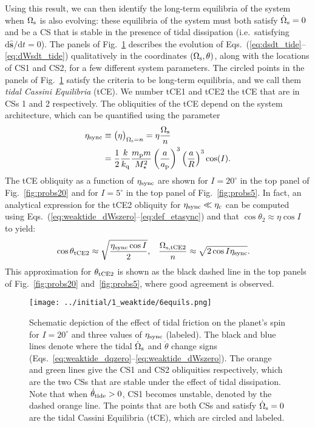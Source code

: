 \documentclass[
        fleqn,
        usenatbib,
    ]{mnras}
\newcommand*{\rdil}[2]{\mathrm{d}#1/\mathrm{d}#2}
\newcommand*{\p}[1]{\left(#1\right)}
\newcommand*{\uv}[1]{\hat{\mathbf{#1}}}
\begin{document}
Using this result, we can then identify the long-term equilibria of the system
when $\Omega_{\rm s}$ is also evolving: these equilibria of the system must both
satisfy $\dot{\Omega}_{\rm s} = 0$ and be a CS that is stable in the presence of
tidal dissipation (i.e.\ satisfying $\rdil{\uv{s}}{t} = 0$).
The panels of Fig.~\ref{fig:6equils} describes the evolution of
Eqs.~(\ref{eq:dsdt_tide}--\ref{eq:dWsdt_tide}) qualitatively in the coordinates
$(\Omega_{\rm s}, \theta)$, along with the locations of CS1 and CS2, for a few
different system parameters. The circled points in the panels of
Fig.~\ref{fig:6equils} satisfy the criteria to be long-term equilibria, and we
call them \emph{tidal Cassini Equilibria} (tCE). We number tCE1 and tCE2 the tCE
that are in CSs 1 and 2 respectively. The obliquities of the tCE depend on the
system architecture, which can be quantified using the parameter
\begin{align}
    \eta_{\rm sync} &\equiv \big(\eta\big)_{\Omega_{\rm s} = n}
        = \eta \frac{\Omega_{\rm s}}{n}\nonumber\\
        &= \frac{1}{2}\frac{k}{k_{\rm q}}
            \frac{m_{\rm p}m}{M_\star^2}
            \p{\frac{a}{a_{\rm p}}}^3 \p{\frac{a}{R}}^3\cos(I).
            \label{eq:def_etasync}
\end{align}
The tCE obliquity as a function of $\eta_{\rm sync}$ are shown for $I =
20^\circ$ in the top panel of Fig.~\ref{fig:probs20} and for $I = 5^\circ$ in
the top panel of Fig.~\ref{fig:probs5}. In fact, an analytical expression for
the tCE2 obliquity for $\eta_{\rm sync} \ll \eta_{\rm c}$ can be computed using
Eqs.~(\ref{eq:weaktide_dWszero}--\ref{eq:def_etasync}) and that $\cos \theta_2
\approx \eta \cos I$ to yield:
\begin{align}
    \cos \theta_{\rm tCE2} &\approx \sqrt{\frac{\eta_{\rm sync} \cos I}{2}},
        &
    \frac{\Omega_{\rm s, tCE2}}{n} &\approx
        \sqrt{2\cos I \eta_{\rm sync}}. \label{eq:def_tce2_approx}
\end{align}
This approximation for $\theta_{\rm tCE2}$ is shown as the black dashed line in
the top panels of Fig.~\ref{fig:probs20} and~\ref{fig:probs5}, where good
agreement is observed.
\begin{figure}
    \centering
    \texttt{[image: ../initial/1\_weaktide/6equils.png]}
    \caption{Schematic depiction of the effect of tidal friction on the planet's
    spin for $I = 20^\circ$ and three values of $\eta_{\rm sync}$ (labeled). The
    black and blue lines denote where the tidal $\dot{\Omega}_{\rm s}$ and
    $\dot{\theta}$ change signs
    (Eqs.~\ref{eq:weaktide_dqzero}--\ref{eq:weaktide_dWszero}). The orange and
    green lines give the CS1 and CS2 obliquities respectively, which are the two
    CSs that are stable under the effect of tidal dissipation. Note that when
    $\dot{\theta}_{\rm tide} > 0$, CS1 becomes unstable, denoted by the dashed
    orange line. The points that are both CSs and satisfy $\dot{\Omega}_{\rm s}
    = 0$ are the tidal Cassini Equilibria (tCE), which are circled and labeled.
    }\label{fig:6equils}
\end{figure}
\end{document}
